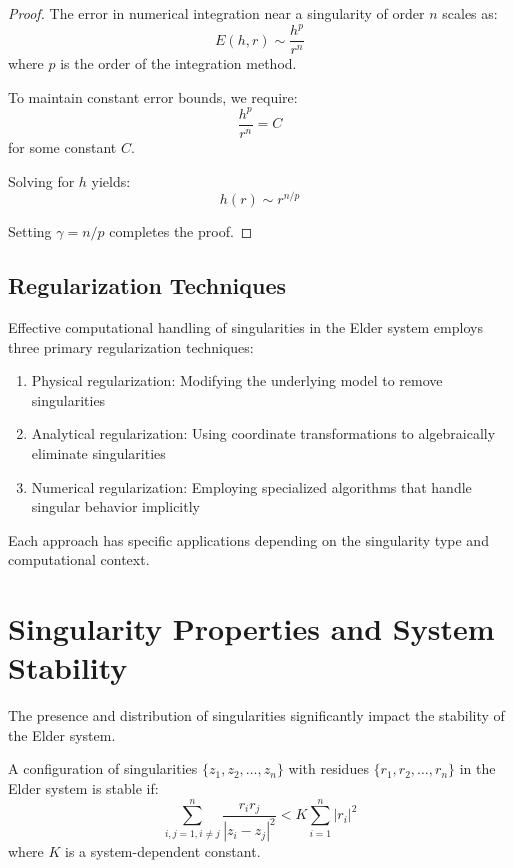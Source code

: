 \begin{definition}
\begin{enumerate}
\begin{proof}
The error in numerical integration near a singularity of order $n$ scales as:
\begin{equation}
E(h, r) \sim \frac{h^p}{r^n}
\end{equation}
where $p$ is the order of the integration method.

To maintain constant error bounds, we require:
\begin{equation}
\frac{h^p}{r^n} = C
\end{equation}
for some constant $C$.

Solving for $h$ yields:
\begin{equation}
h(r) \sim r^{n/p}
\end{equation}

Setting $\gamma = n/p$ completes the proof.
\end{proof}

\subsection{Regularization Techniques}

\begin{theorem}
Effective computational handling of singularities in the Elder system employs three primary regularization techniques:
\begin{enumerate}
    \item Physical regularization: Modifying the underlying model to remove singularities
    \item Analytical regularization: Using coordinate transformations to algebraically eliminate singularities
    \item Numerical regularization: Employing specialized algorithms that handle singular behavior implicitly
\end{enumerate}
\end{theorem}

Each approach has specific applications depending on the singularity type and computational context.

\section{Singularity Properties and System Stability}

The presence and distribution of singularities significantly impact the stability of the Elder system.

\begin{theorem}
A configuration of singularities $\{z_1, z_2, \ldots, z_n\}$ with residues $\{r_1, r_2, \ldots, r_n\}$ in the Elder system is stable if:
\begin{equation}
\sum_{i,j=1, i \neq j}^n \frac{r_i r_j}{|z_i - z_j|^2} < K \sum_{i=1}^n |r_i|^2
\end{equation}
where $K$ is a system-dependent constant.
\end{theorem}


\end{enumerate}
\end{definition}
